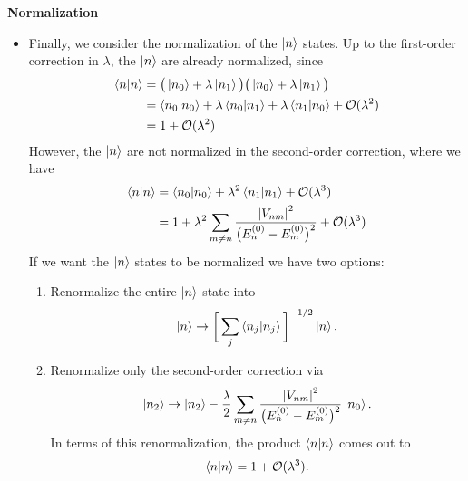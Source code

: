 \documentclass[11pt, a4paper]{article}
\begin{document}
\textbf{Normalization}
\begin{itemize} 
    \item Finally, we consider the normalization of the $ \ket{n} $ states. Up to the first-order correction in $ \lambda $, the $ \ket{n} $ are already normalized, since
    \begin{align*}
        \braket{n}{n} &= \big( \ket{n_{0}} + \lambda \ket{n_{1}} \big)\big( \ket{n_{0}} + \lambda \ket{n_{1}} \big)\\
        &= \braket{n_{0}}{n_{0}} + \lambda \braket{n_{0}}{n_{1}} + \lambda \braket{n_{1}}{n_{0}} + \mathcal{O}(\lambda^{2})\\
        & = 1 + \mathcal{O}(\lambda^{2})
    \end{align*}
    However, the $ \ket{n} $ are not normalized in the second-order correction, where we have
    \begin{align*}
        \braket{n}{n} &= \braket{n_{0}}{n_{0}} + \lambda^{2} \braket{n_{1}}{n_{1}} + \mathcal{O}(\lambda^{3})\\
        & = 1 + \lambda^{2} \sum_{m \neq n} \frac{\abs{V_{nm}}^{2}}{\big( E_{n}^{(0)} - E_{m}^{(0)} \big)^{2}} + \mathcal{O}(\lambda^{3})
    \end{align*}
    If we want the $ \ket{n} $ states to be normalized we have two options:
    \begin{enumerate}
        \item Renormalize the entire $ \ket{n} $ state into
        \begin{equation*}
           \ket{n} \to \bigg[ \sum_{j} \braket{n_{j}}{n_{j}} \bigg]^{-1/2} \ket{n}.
        \end{equation*}
        
        \item Renormalize only the second-order correction via
        \begin{equation*}
            \ket{n_{2}} \to \ket{n_{2}} - \frac{\lambda}{2} \sum_{m \neq n} \frac{\abs{V_{nm}}^{2}}{\big( E_{n}^{(0)} - E_{m}^{(0)} \big)^{2}}\ket{n_{0}}.
        \end{equation*}
        In terms of this renormalization, the product $ \braket{n}{n} $ comes out to
        \begin{equation*}
            \braket{n}{n} = 1 + \mathcal{O}(\lambda^{3}).
        \end{equation*}
        
    \end{enumerate}
    
\end{itemize}
\end{document}
